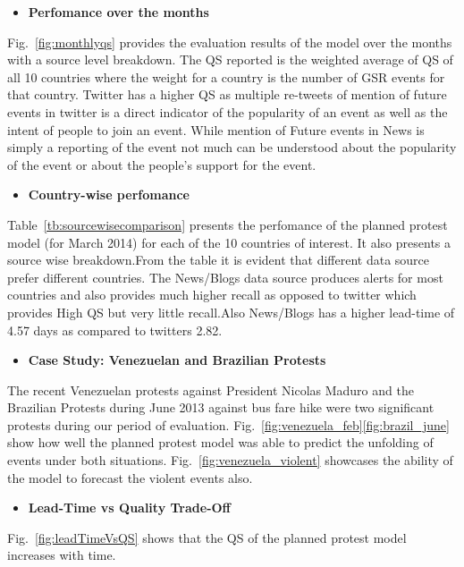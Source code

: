 \begin{itemize}
    \item {\bf Perfomance over the months}
\end{itemize}
    Fig.~\ref{fig:monthlyqs} provides the evaluation results of the model over the months with a source level breakdown. The QS reported is the weighted average of QS of all 10 countries where the weight for a country is the number of GSR events for that country.
    Twitter has a higher QS as multiple re-tweets of mention of future events in twitter is a direct indicator of the popularity of an event as well as the intent of people to join an event. While mention of Future events in News is simply a reporting of the event not much can be understood about the popularity of the event or about the people's support for the event. 
\begin{itemize}
    \item {\bf Country-wise perfomance}
\end{itemize}
    Table~\ref{tb:sourcewisecomparison} presents the perfomance of the planned protest model (for March 2014) for each of the 10 countries of interest. It also presents a source wise breakdown.From the table it is evident that different data source prefer different countries. The News/Blogs data source produces alerts for most countries and also provides much higher recall as opposed to twitter which provides High QS but very little recall.Also News/Blogs has a higher lead-time of 4.57 days as compared to twitters 2.82.

\begin{itemize}
    \item {\bf Case Study: Venezuelan and Brazilian Protests}
\end{itemize}
The recent Venezuelan protests against President Nicolas Maduro and the Brazilian Protests during June 2013 against bus fare hike were two significant protests during our period of evaluation. Fig.~\ref{fig:venezuela_feb}\ref{fig:brazil_june} show how well the planned protest model was able to predict the unfolding of events under both situations. Fig.~\ref{fig:venezuela_violent} showcases the ability of the model to forecast the violent events also.

\begin{itemize}
    \item {\bf Lead-Time vs Quality Trade-Off}
\end{itemize}

Fig.~\ref{fig:leadTimeVsQS} shows that the QS of the planned protest model increases with time. 

